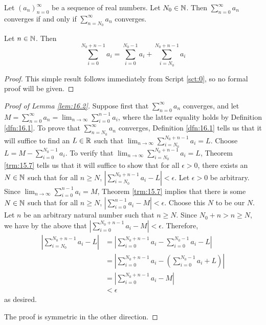 \documentclass[../main.tex]{subfiles}
\begin{document}
\begin{lemma}\label{lem:16.2}
    Let $(a_n)_{n=0}^\infty$ be a sequence of real numbers. Let $N_0\in\mathbb{N}$. Then $\sum_{n=0}^\infty a_n$ converges if and only if $\sum_{n=N_0}^\infty a_n$ converges.
    \begin{lemma*}
        Let $n\in\mathbb{N}$. Then
        \begin{equation*}
            \sum_{i=0}^{N_0+n-1}a_i = \sum_{i=0}^{N_0-1}a_i+\sum_{i=N_0}^{N_0+n-1}a_i
        \end{equation*}
        \begin{proof}
            This simple result follows immediately from Script \ref{sct:0}, so no formal proof will be given.
        \end{proof}
    \end{lemma*}
    \begin{proof}[Proof of Lemma \ref{lem:16.2}]
        Suppose first that $\sum_{n=0}^\infty a_n$ converges, and let $M=\sum_{n=0}^\infty a_n=\lim_{n\to\infty}\sum_{i=0}^{n-1}a_i$, where the latter equality holds by Definition \ref{dfn:16.1}. To prove that $\sum_{n=N_0}^\infty a_n$ converges, Definition \ref{dfn:16.1} tells us that it will suffice to find an $L\in\mathbb{R}$ such that $\lim_{n\to\infty}\sum_{i=N_0}^{N_0+n-1}a_i=L$. Choose $L=M-\sum_{i=0}^{N_0-1}a_i$. To verify that $\lim_{n\to\infty}\sum_{i=N_0}^{N_0+n-1}a_i=L$, Theorem \ref{trm:15.7} tells us that it will suffice to show that for all $\epsilon>0$, there exists an $N\in\mathbb{N}$ such that for all $n\geq N$, $|\sum_{i=N_0}^{N_0+n-1}a_i-L|<\epsilon$. Let $\epsilon>0$ be arbitrary. Since $\lim_{n\to\infty}\sum_{i=0}^{n-1}a_i=M$, Theorem \ref{trm:15.7} implies that there is some $N\in\mathbb{N}$ such that for all $n\geq N$, $|\sum_{i=0}^{n-1}a_i-M|<\epsilon$. Choose this $N$ to be our $N$. Let $n$ be an arbitrary natural number such that $n\geq N$. Since $N_0+n>n\geq N$, we have by the above that $|\sum_{i=0}^{N_0+n-1}a_i-M|<\epsilon$. Therefore,
        \begin{align*}
            \left| \sum_{i=N_0}^{N_0+n-1}a_i-L \right| &= \left| \sum_{i=0}^{N_0+n-1}a_i-\sum_{i=0}^{N_0-1}a_i-L \right|\tag*{The Lemma}\\
            &= \left| \sum_{i=0}^{N_0+n-1}a_i-\left( \sum_{i=0}^{N_0-1}a_i+L \right) \right|\\
            &= \left| \sum_{i=0}^{N_0+n-1}a_i-M \right|\\
            &< \epsilon
        \end{align*}
        as desired.\par
        The proof is symmetric in the other direction.
    \end{proof}
\end{lemma}
\end{document}
